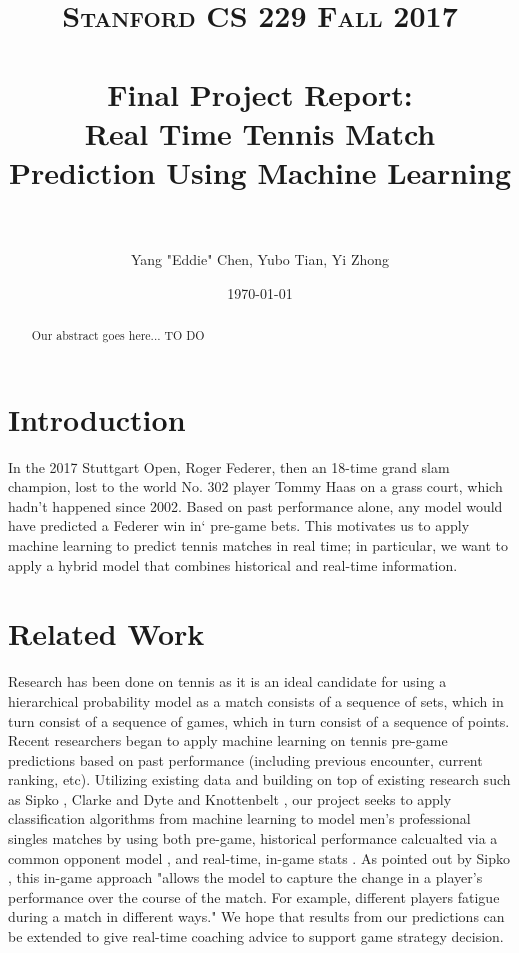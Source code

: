 \documentclass[paper=a4, fontsize=11pt]{scrartcl} %
\title{	
\normalfont \normalsize 
\textsc{Stanford CS 229 Fall 2017} \\ [20pt] %
\horrule{0.5pt} \\[0.4cm] %
\Large Final Project Report: \\
\Large Real Time Tennis Match Prediction Using Machine Learning\\ %
\horrule{2pt} \\[0.5cm] %
}
\author{Yang "Eddie" Chen, Yubo Tian, Yi Zhong} %
\date{\normalsize\today} %
\numberwithin{equation}{section} %
\numberwithin{figure}{section} %
\numberwithin{table}{section} %
\begin{document}
\twocolumn[
\maketitle %
]
\begin{abstract}
Our abstract goes here... TO DO
\end{abstract}

\section{Introduction}
In the 2017 Stuttgart Open, Roger Federer, then an 18-time grand slam champion, lost to the world No. 302 player Tommy Haas on a grass court, which hadn't happened since 2002.  Based on past performance alone, any model would have predicted a Federer win in` pre-game bets. This motivates us to apply machine learning to predict tennis matches in real time; in particular, we want to apply a hybrid model that combines historical and real-time information.

\section{Related Work}
Research has been done on tennis as it is an ideal candidate for using a hierarchical probability model as a match consists of a sequence of sets, which in turn consist of a sequence of games, which in turn consist of a sequence of points.  Recent researchers began to apply machine learning on tennis pre-game predictions based on past performance (including previous encounter, current ranking, etc). Utilizing existing data and building on top of existing research such as Sipko \cite{tennis1}, Clarke and Dyte \cite{Clarke2010} and Knottenbelt \cite{KNOTTENBELT20123820}, our project seeks to apply classification algorithms from machine learning to model men's professional singles matches by using both pre-game, historical performance calcualted via a common opponent model \cite{KNOTTENBELT20123820}, and real-time, in-game stats \cite{tennis_charting} \cite{tennis2setbyset}. As pointed out by Sipko \cite{tennis1}, this in-game approach "allows the model to capture the change in a player's performance over the course of the match. For example, different players fatigue during a match in different ways." We hope that results from our predictions can be extended to give real-time coaching advice to support game strategy decision.
\end{document}
